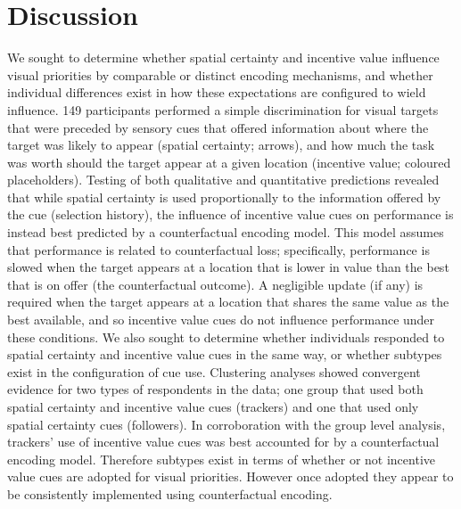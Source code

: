 \documentclass[11pt,halfline,a4paper,]{ouparticle}
\begin{document}
\hypertarget{discussion}{%
\section{Discussion}\label{discussion}}

\label{sec:discussion}

We sought to determine whether spatial certainty and incentive value influence visual priorities by comparable or distinct encoding mechanisms, and whether individual differences exist in how these expectations are configured to wield influence. 149 participants performed a simple discrimination for visual targets that were preceded by sensory cues that offered information about where the target was likely to appear (spatial certainty; arrows), and how much the task was worth should the target appear at a given location (incentive value; coloured placeholders). Testing of both qualitative and quantitative predictions revealed that while spatial certainty is used proportionally to the information offered by the cue (selection history), the influence of incentive value cues on performance is instead best predicted by a counterfactual encoding model. This model assumes that performance is related to counterfactual loss; specifically, performance is slowed when the target appears at a location that is lower in value than the best that is on offer (the counterfactual outcome). A negligible update (if any) is required when the target appears at a location that shares the same value as the best available, and so incentive value cues do not influence performance under these conditions. We also sought to determine whether individuals responded to spatial certainty and incentive value cues in the same way, or whether subtypes exist in the configuration of cue use. Clustering analyses showed convergent evidence for two types of respondents in the data; one group that used both spatial certainty and incentive value cues (trackers) and one that used only spatial certainty cues (followers). In corroboration with the group level analysis, trackers' use of incentive value cues was best accounted for by a counterfactual encoding model. Therefore subtypes exist in terms of whether or not incentive value cues are adopted for visual priorities. However once adopted they appear to be consistently implemented using counterfactual encoding.
\end{document}
